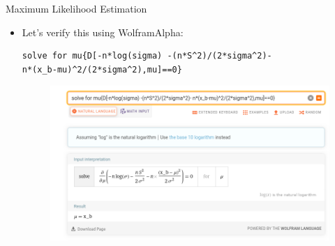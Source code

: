 \documentclass[handout]{beamer}
\begin{document}
\begin{frame}[fragile]{Maximum Likelihood Estimation}
\scriptsize{
\begin{itemize}
\item Let's verify this using WolframAlpha:

\begin{verbatim}
solve for mu{D[-n*log(sigma) -(n*S^2)/(2*sigma^2)- 
n*(x_b-mu)^2/(2*sigma^2),mu]==0}  
\end{verbatim}

\begin{figure}[h!]
	\centering
	\includegraphics[scale=0.32]{pics/wolfram_mu.png}
\end{figure}



\end{itemize}



} 

\end{frame}
\end{document}
